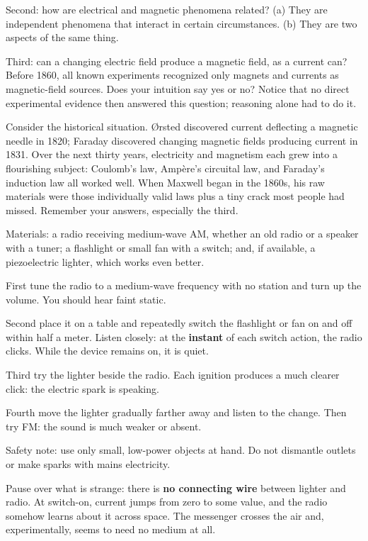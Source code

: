 Second: how are electrical and magnetic phenomena related? (a) They are independent phenomena that interact in certain circumstances. (b) They are two aspects of the same thing.

Third: can a changing electric field produce a magnetic field, as a current can? Before 1860, all known experiments recognized only magnets and currents as magnetic-field sources. Does your intuition say yes or no? Notice that no direct experimental evidence then answered this question; reasoning alone had to do it.

Consider the historical situation. Ørsted discovered current deflecting a magnetic needle in 1820; Faraday discovered changing magnetic fields producing current in 1831. Over the next thirty years, electricity and magnetism each grew into a flourishing subject: Coulomb's law, Ampère's circuital law, and Faraday's induction law all worked well. When Maxwell began in the 1860s, his raw materials were those individually valid laws plus a tiny crack most people had missed. Remember your answers, especially the third.


\begin{experiment}
Materials: a radio receiving medium-wave AM, whether an old radio or a speaker with a tuner; a flashlight or small fan with a switch; and, if available, a piezoelectric lighter, which works even better.

First tune the radio to a medium-wave frequency with no station and turn up the volume. You should hear faint static.

Second place it on a table and repeatedly switch the flashlight or fan on and off within half a meter. Listen closely: at the \textbf{instant} of each switch action, the radio clicks. While the device remains on, it is quiet.

Third try the lighter beside the radio. Each ignition produces a much clearer click: the electric spark is speaking.

Fourth move the lighter gradually farther away and listen to the change. Then try FM: the sound is much weaker or absent.

Safety note: use only small, low-power objects at hand. Do not dismantle outlets or make sparks with mains electricity.
\end{experiment}

Pause over what is strange: there is \textbf{no connecting wire} between lighter and radio. At switch-on, current jumps from zero to some value, and the radio somehow learns about it across space. The messenger crosses the air and, experimentally, seems to need no medium at all.

